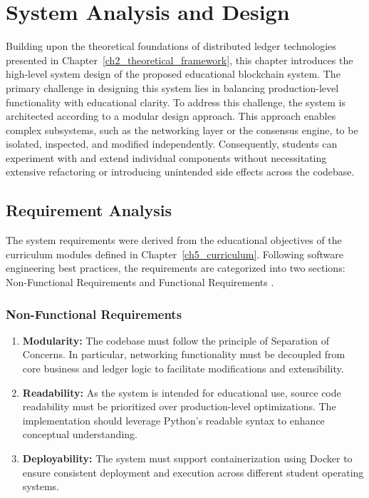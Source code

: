 \chapter{System Analysis and Design} \label{ch3_design}

Building upon the theoretical foundations of distributed ledger technologies presented in Chapter~\ref{ch2_theoretical_framework}, this chapter introduces the high-level system design of the proposed educational blockchain system. The primary challenge in designing this system lies in balancing production-level functionality with educational clarity. To address this challenge, the system is architected according to a modular design approach. This approach enables complex subsystems, such as the networking layer or the consensus engine, to be isolated, inspected, and modified independently. Consequently, students can experiment with and extend individual components without necessitating extensive refactoring or introducing unintended side effects across the codebase.

\section{Requirement Analysis}
\label{ch3_requirements}

The system requirements were derived from the educational objectives of the curriculum modules defined in Chapter~\ref{ch5_curriculum}. Following software engineering best practices, the requirements are categorized into two sections: Non-Functional Requirements and Functional Requirements \cite{sommerville2011software}.

\subsection{Non-Functional Requirements}

\begin{enumerate}
    \item \textbf{Modularity:}  
    The codebase must follow the principle of Separation of Concerns. In particular, networking functionality must be decoupled from core business and ledger logic to facilitate modifications and extensibility.

    \item \textbf{Readability:}  
    As the system is intended for educational use, source code readability must be prioritized over production-level optimizations. The implementation should leverage Python’s readable syntax to enhance conceptual understanding.

    \item \textbf{Deployability:}  
    The system must support containerization using Docker to ensure consistent deployment and execution across different student operating systems.
\end{enumerate}

